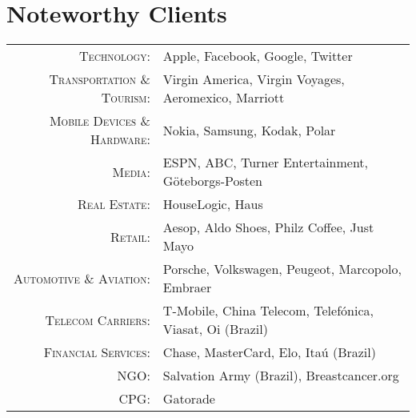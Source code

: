 \documentclass[a4paper,10pt]{article}
\begin{document}
\section{Noteworthy Clients}

\begin{tabular}{rl}
  \textsc{Technology:} &
    Apple,
    Facebook,
    Google,
    Twitter \\

  \textsc{Transportation \& Tourism:} &
    Virgin America,
    Virgin Voyages,
    Aeromexico,
    Marriott \\

  \textsc{Mobile Devices \& Hardware:} &

    Nokia,
    Samsung,
    Kodak,
    Polar \\

  \textsc{Media:} &

    ESPN,
    ABC,
    Turner Entertainment,
    G\"{o}teborgs-Posten \\

  \textsc{Real Estate:} &

    HouseLogic,
    Haus\\

  \textsc{Retail:} &

    Aesop,
    Aldo Shoes,
    Philz Coffee,
    Just Mayo\\

  \textsc{Automotive \& Aviation:} &

    Porsche,
    Volkswagen,
    Peugeot,
    Marcopolo,
    Embraer\\

  \textsc{Telecom Carriers:} &

    T-Mobile,
    China Telecom,
    Telef\'{o}nica,
    Viasat,
    Oi (Brazil)\\

  \textsc{Financial Services:} &

    Chase,
    MasterCard,
    Elo,
    Ita\'{u} (Brazil)\\

  \textsc{NGO:} &

    Salvation Army (Brazil),
    Breastcancer.org\\
    
  \textsc{CPG:} &

  Gatorade
  
\end{tabular}



\end{document}
